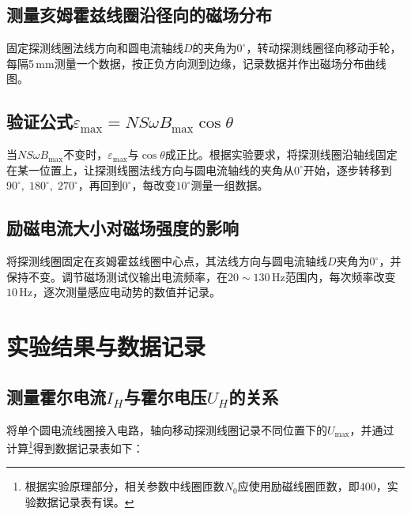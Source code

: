 \documentclass[UTF-8,twoside,cs4size]{ctexart}
\begin{document}
	\subsection{测量亥姆霍兹线圈沿径向的磁场分布}
	固定探测线圈法线方向和圆电流轴线$ D $的夹角为$ 0^\circ $，转动探测线圈径向移动手轮，每隔5\,mm测量一个数据，按正负方向测到边缘，记录数据并作出磁场分布曲线图。
	\subsection{验证公式$ \varepsilon_\max=NS\omega B_\max\cos\theta $}
	当$ NS\omega B_\max $不变时，$ \varepsilon_\max $与$ \cos\theta $成正比。根据实验要求，将探测线圈沿轴线固定在某一位置上，让探测线圈法线方向与圆电流轴线的夹角从$ 0^\circ $开始，逐步转移到$ 90^\circ,\;180^\circ,\;270^\circ $，再回到$ 0^\circ $，每改变$ 10^\circ $测量一组数据。
	\subsection{励磁电流大小对磁场强度的影响}
	将探测线圈固定在亥姆霍兹线圈中心点，其法线方向与圆电流轴线$ D $夹角为$ 0^\circ $，并保持不变。调节磁场测试仪输出电流频率，在$ 20\sim 130\,\mathrm{Hz} $范围内，每次频率改变$ 10\,\mathrm{Hz} $，逐次测量感应电动势的数值并记录。
	
	\section{实验结果与数据记录}
	\subsection{测量霍尔电流$ I_H $与霍尔电压$ U_H $的关系}
	将单个圆电流线圈接入电路，轴向移动探测线圈记录不同位置下的$ U_\max $，并通过计算\footnote{根据实验原理部分，相关参数中线圈匝数$ N_0 $应使用励磁线圈匝数，即400，实验数据记录表有误。}得到数据记录表如下：
	
\end{document}
